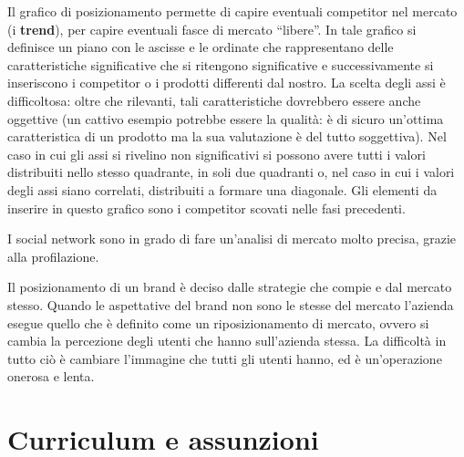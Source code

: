 Il grafico di posizionamento permette di capire eventuali competitor nel
mercato (i \textbf{trend}), per capire eventuali fasce di mercato ``libere''.
In tale grafico si definisce un piano con le ascisse e le ordinate che
rappresentano delle caratteristiche significative che si ritengono
significative e successivamente si inseriscono i competitor o i prodotti
differenti dal nostro. La scelta degli assi è difficoltosa: oltre che
rilevanti, tali caratteristiche dovrebbero essere anche oggettive (un cattivo
esempio potrebbe essere la qualità: è di sicuro un'ottima caratteristica di un
prodotto ma la sua valutazione è del tutto soggettiva). Nel caso in cui gli
assi si rivelino non significativi si possono avere tutti i valori distribuiti
nello stesso quadrante, in soli due quadranti o, nel caso in cui i valori degli
assi siano correlati, distribuiti a formare una diagonale. Gli elementi da
inserire in questo grafico sono i competitor scovati nelle fasi precedenti.


I social network sono in grado di fare un'analisi di mercato molto precisa,
grazie alla profilazione.

Il posizionamento di un brand è deciso dalle strategie che compie e dal mercato
stesso. Quando le aspettative del brand non sono le stesse del mercato
l'azienda esegue quello che è definito come un riposizionamento di mercato,
ovvero si cambia la percezione degli utenti che hanno sull'azienda stessa. La
difficoltà in tutto ciò è cambiare l'immagine che tutti gli utenti hanno, ed è
un'operazione onerosa e lenta.

\chapter{Curriculum e assunzioni}

